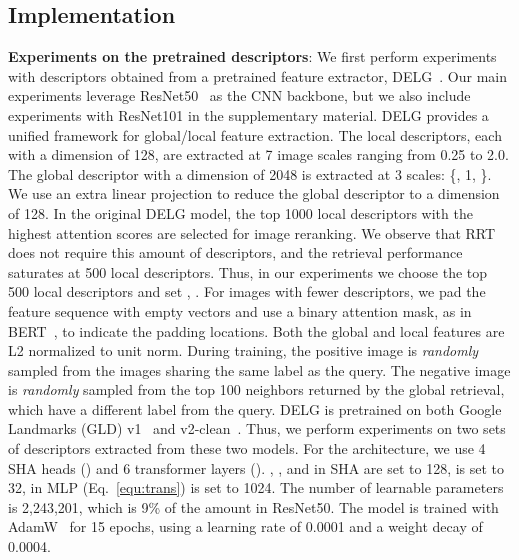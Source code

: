 \subsection{Implementation}
\label{sec:impl}
\textbf{Experiments on the pretrained descriptors}: We first perform experiments with descriptors obtained from a pretrained feature extractor, DELG~\cite{delg2020}.
Our main experiments leverage ResNet50~\cite{resnet2016} as the CNN backbone, but we also include experiments with ResNet101 in the supplementary material.
DELG provides a unified framework for global/local feature extraction. 
The local descriptors, each with a dimension of 128, are extracted at 7 image scales ranging from 0.25 to 2.0.
The global descriptor with a dimension of 2048 is extracted at 3 scales: \{, 1, \}.
We use an extra linear projection to reduce the global descriptor to a dimension of 128. 
In the original DELG model, the top 1000 local descriptors with the highest attention scores are selected for image reranking.
We observe that RRT does not require this amount of descriptors, and the retrieval performance saturates at 500 local descriptors.
Thus, in our experiments we choose the top 500 local descriptors and set , .
For images with fewer descriptors, we pad the feature sequence with empty vectors and use a binary attention mask, as in BERT~\cite{bert2019}, to indicate the padding locations.
Both the global and local features are L2 normalized to unit norm.
During training, the positive image is \textit{randomly} sampled from the images sharing the same label as the query.
The negative image is \textit{randomly} sampled from the top 100 neighbors returned by the global retrieval, which have a different label from the query.
DELG is pretrained on both Google Landmarks (GLD) v1~\cite{delf2017} and v2-clean~\cite{gldv2}. Thus, we perform experiments on two sets of descriptors extracted from these two models. For the architecture, we use 4 SHA heads () and 6 transformer layers (). , ,  and  in SHA are set to 128,  is set to 32,  in \textsc{MLP} (Eq.~\ref{equ:trans}) is set to 1024. 
The number of learnable parameters is 2,243,201, which is 9\% of the amount in ResNet50.
The model is trained with AdamW~\cite{adamw2019} for 15 epochs, using a learning rate of 0.0001 and a weight decay of 0.0004.


